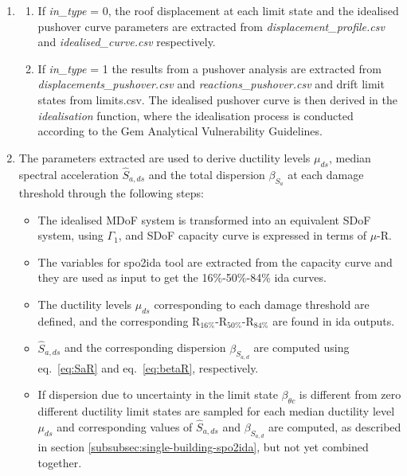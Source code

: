 \begin{enumerate}
\item 
\begin{enumerate}
\item If \textit{in\_type} = 0, the roof displacement at each limit state and the idealised pushover curve parameters are extracted from \textit{displacement\_profile.csv} and \textit{idealised\_curve.csv} respectively.

\item If \textit{in\_type} = 1 the results from a pushover analysis are extracted from \textit{displacements\_pushover.csv} and \textit{reactions\_pushover.csv} and drift limit states from {limits.csv}. The idealised pushover curve is then derived in the \textit{idealisation} function, where the idealisation process is conducted according to the Gem Analytical Vulnerability Guidelines.	\end{enumerate}

\item The parameters extracted are used to derive ductility levels $\mu_{ds}$, median spectral acceleration $\hat{S}_{a,ds}$ and the total dispersion $\beta_{S_a}$ at each damage threshold through the following steps:
\begin{itemize}
\item The idealised MDoF system is transformed into an equivalent SDoF system, using $\Gamma_1$, and SDoF capacity curve is  expressed in terms of $\mu$-R.

\item The variables for spo2ida tool are extracted from the capacity curve and they are used as input to get the 16\%-50\%-84\% ida curves.

\item The ductility levels $\mu_{ds}$ corresponding to each damage threshold are defined, and the corresponding R$_{16\%}$-R$_{50\%}$-R$_{84\%}$ are found in ida outputs.

\item $\hat{S}_{a,ds}$ and the corresponding dispersion $\beta_{S_{a, d}}$ are computed using eq.~\ref{eq:SaR} and eq.~\ref{eq:betaR}, respectively.

\item If dispersion due to uncertainty in the limit state $\beta_{\theta c}$ is different from zero different ductility limit states are sampled for each median ductility level $\mu_{ds}$ and corresponding values of $\hat{S}_{a,ds}$ and $\beta_{S_{a, d}}$ are computed, as described in section \ref{subsubsec:single-building-spo2ida}, but not yet combined together.


\end{itemize}
\end{enumerate}
